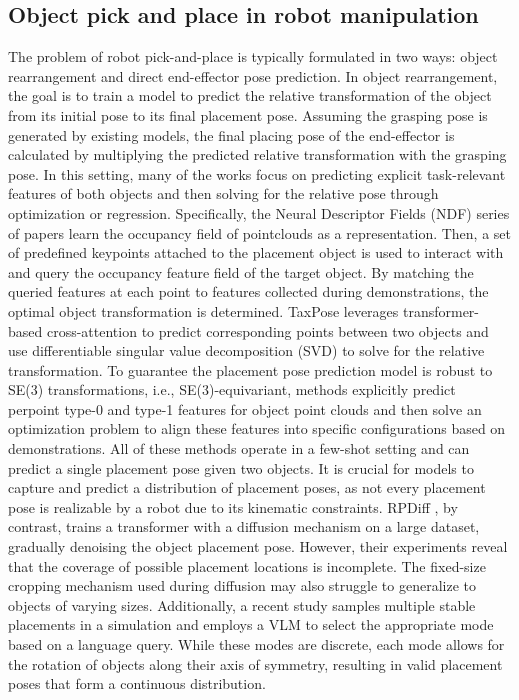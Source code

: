 \subsection{Object pick and place in robot manipulation}
The problem of robot pick-and-place is typically formulated in two ways: object rearrangement and direct end-effector pose prediction. 
In object rearrangement, the goal is to train a model to predict the relative transformation of the object from its initial pose to its final placement pose. Assuming the grasping pose is generated by existing models, the final placing pose of the end-effector is calculated by multiplying the predicted relative transformation with the grasping pose. In this setting, many of the works focus on predicting explicit task-relevant features of both objects and then solving for the relative pose through optimization or regression. Specifically, the Neural Descriptor Fields (NDF) series of papers \cite{simeonov2021neuraldescriptorfieldsse3equivariant, 10160423, pmlr-v205-simeonov23a} learn the occupancy field of pointclouds as a representation. Then, a set of predefined keypoints attached to the placement object is used to interact with and query the occupancy feature field of the target object. By matching the queried features at each point to features collected during demonstrations, the optimal object transformation is determined. TaxPose \cite{pan2022taxpose} leverages transformer-based cross-attention to predict corresponding points between two objects and use differentiable singular value decomposition (SVD) to solve for the relative transformation. To guarantee the placement pose prediction model is robust to SE(3) transformations, i.e., SE(3)-equivariant, methods \cite{ryu2023diffusionedfsbiequivariantdenoisinggenerative, ryu2023equivariantdescriptorfieldsse3equivariant, gao2024riemann} explicitly predict perpoint type-0 and type-1 features for object point clouds and then solve an optimization problem to align these features into specific configurations based on demonstrations. All of these methods operate in a few-shot setting and can predict a single placement pose given two objects. It is crucial for models to capture and predict a distribution of placement poses, as not every placement pose is realizable by a robot due to its kinematic constraints.  RPDiff \cite{simeonov2023rpdiff}, by contrast, trains a transformer with a diffusion mechanism on a large dataset, gradually denoising the object placement pose. However, their experiments reveal that the coverage of possible placement locations is incomplete. The fixed-size cropping mechanism used during diffusion may also struggle to generalize to objects of varying sizes. Additionally, a recent study \cite{ding2024opendor} samples multiple stable placements in a simulation and employs a VLM to select the appropriate mode based on a language query. While these modes are discrete, each mode allows for the rotation of objects along their axis of symmetry, resulting in valid placement poses that form a continuous distribution. 


